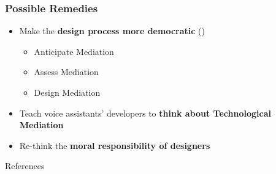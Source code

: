 \documentclass{beamer}
\begin{document}
\begin{frame}
\frametitle{Possible Remedies}
\begin{itemize}
	\item Make the \textbf{design process more democratic} (\cite{verbeek2011moralizing})
	\smallskip
	\begin{itemize}
		\item Anticipate Mediation
		\item Assess Mediation
		\item Design Mediation
	\end{itemize}
	\medskip
	\item Teach voice assistants' developers to \textbf{think about Technological Mediation}
	\medskip
	\item Re-think the \textbf{moral responsibility of designers}
\end{itemize}
\end{frame}

\nocite{*}
\begin{frame}{References}
\renewcommand*{\bibfont}{\small}
\printbibliography
\end{frame}
\end{document}
